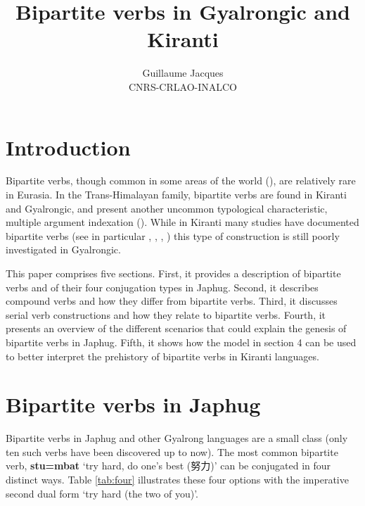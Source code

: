 \documentclass[oneside,a4paper,11pt]{article}
\newcommand{\ipa}[1]{{\phon\textbf{#1}}}
\newcommand{\zh}[1]{{\cn #1}}
\newcommand{\jpg}[2]{\ipa{#1} `#2'}
\begin{document}
 
\title{Bipartite verbs in Gyalrongic and Kiranti}
\author{Guillaume Jacques\\ CNRS-CRLAO-INALCO}
\maketitle



 \section*{Introduction}
Bipartite verbs, though common in some areas of the world (\citealt{delancey96bipartite}), are relatively rare in Eurasia. In the Trans-Himalayan family, bipartite verbs are found in Kiranti and Gyalrongic, and present another uncommon typological characteristic, 
multiple argument indexation (\citealt{denk15multiple}). While in Kiranti many studies have documented bipartite verbs (see in particular \citealt{driem87}, \citealt{bickel07chintang}, \citealt{doornenbal09}, \citealt{schackow15yakkha}) this type of construction is still poorly investigated in Gyalrongic.

This paper comprises five sections. First, it provides a description of bipartite verbs and of their four conjugation types in Japhug. Second, it describes compound verbs and how they differ from bipartite verbs. Third, it discusses serial verb constructions and how they relate to bipartite verbs. Fourth, it presents an overview of the different scenarios that could explain the genesis of bipartite verbs in Japhug. Fifth, it shows how the model in section 4 can be used to better interpret the prehistory of bipartite verbs in Kiranti languages.

\section{Bipartite verbs in Japhug} \label{sec:japhug.bipart}

Bipartite verbs in Japhug and other Gyalrong languages are a small class (only ten such verbs have been discovered up to now). 
The most common bipartite verb, \jpg{stu=mbat}{try hard, do one's best (\zh{努力})} can be conjugated in four distinct ways. Table \ref{tab:four} illustrates these four options with the imperative second dual form `try hard (the two of you)'.
\end{document}
